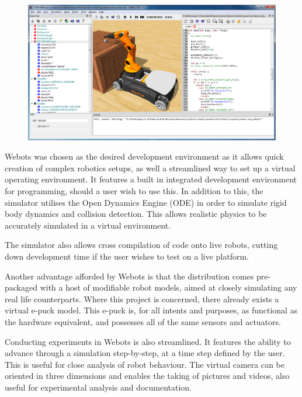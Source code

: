 \begin{figure}[h]
	\begin{minipage}{.75\textwidth}
		\centering
		\includegraphics[width=1.35\linewidth]{webots-screen}
		\label{fig:epuck-elec}
	\end{minipage}
\end{figure}

Webots was chosen as the desired development environment as it allows quick creation of complex robotics setups, as well a streamlined way to set up a virtual operating environment. It features a built in integrated development environment for programming, should a user wish to use this. In addition to this, the simulator utilises the Open Dynamics Engine (ODE) in order to simulate rigid body dynamics and collision detection. This allows realistic physics to be accurately simulated in a virtual environment.

The simulator also allows cross compilation of code onto live robots, cutting down development time if the user wishes to test on a live platform.

Another advantage afforded by Webots is that the distribution comes pre-packaged with a host of modifiable robot models, aimed at closely simulating any real life counterparts. Where this project is concerned, there already exists a virtual e-puck model. This e-puck is, for all intents and purposes, as functional as the hardware equivalent, and possesses all of the same sensors and actuators.

Conducting experiments in Webots is also streamlined. It features the ability to advance through a simulation step-by-step, at a time step defined by the user. This is useful for close analysis of robot behaviour. The virtual camera can be oriented in three dimensions and enables the taking of pictures and videos, also useful for experimental analysis and documentation.

